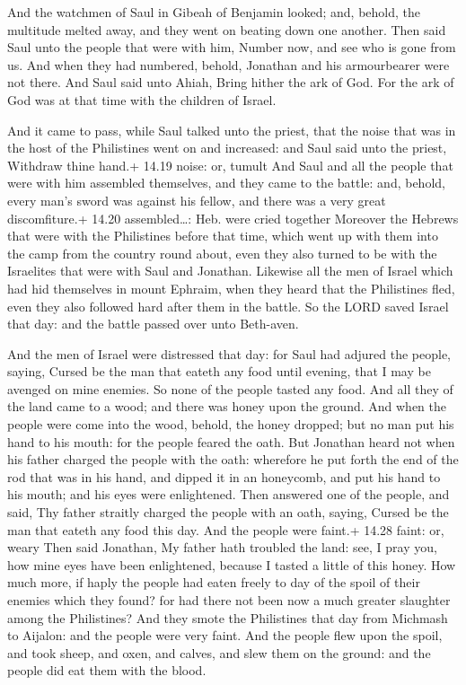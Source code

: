  And the watchmen of Saul in Gibeah of Benjamin looked;
and, behold, the multitude melted away, and they went on beating down
one another.  Then said Saul unto the people that were with
him, Number now, and see who is gone from us. And when they had
numbered, behold, Jonathan and his armourbearer were not there.
 And Saul said unto Ahiah, Bring hither the ark of God. For
the ark of God was at that time with the children of Israel.

 And it came to pass, while Saul talked unto the priest,
that the noise that was in the host of the Philistines went on and
increased: and Saul said unto the priest, Withdraw thine hand.+ 14.19
noise: or, tumult  And Saul and all the people that were
with him assembled themselves, and they came to the battle: and, behold,
every man's sword was against his fellow, and there was a very great
discomfiture.+ 14.20 assembled\ldots: Heb. were cried together
 Moreover the Hebrews that were with the Philistines before
that time, which went up with them into the camp from the country round
about, even they also turned to be with the Israelites that were with
Saul and Jonathan.  Likewise all the men of Israel which
had hid themselves in mount Ephraim, when they heard that the
Philistines fled, even they also followed hard after them in the battle.
 So the LORD saved Israel that day: and the battle passed
over unto Beth-aven.

 And the men of Israel were distressed that day: for Saul
had adjured the people, saying, Cursed be the man that eateth any food
until evening, that I may be avenged on mine enemies. So none of the
people tasted any food.  And all they of the land came to a
wood; and there was honey upon the ground.  And when the
people were come into the wood, behold, the honey dropped; but no man
put his hand to his mouth: for the people feared the oath. 
But Jonathan heard not when his father charged the people with the oath:
wherefore he put forth the end of the rod that was in his hand, and
dipped it in an honeycomb, and put his hand to his mouth; and his eyes
were enlightened.  Then answered one of the people, and
said, Thy father straitly charged the people with an oath, saying,
Cursed be the man that eateth any food this day. And the people were
faint.+ 14.28 faint: or, weary  Then said Jonathan, My
father hath troubled the land: see, I pray you, how mine eyes have been
enlightened, because I tasted a little of this honey.  How
much more, if haply the people had eaten freely to day of the spoil of
their enemies which they found? for had there not been now a much
greater slaughter among the Philistines?  And they smote
the Philistines that day from Michmash to Aijalon: and the people were
very faint.  And the people flew upon the spoil, and took
sheep, and oxen, and calves, and slew them on the ground: and the people
did eat them with the blood.

